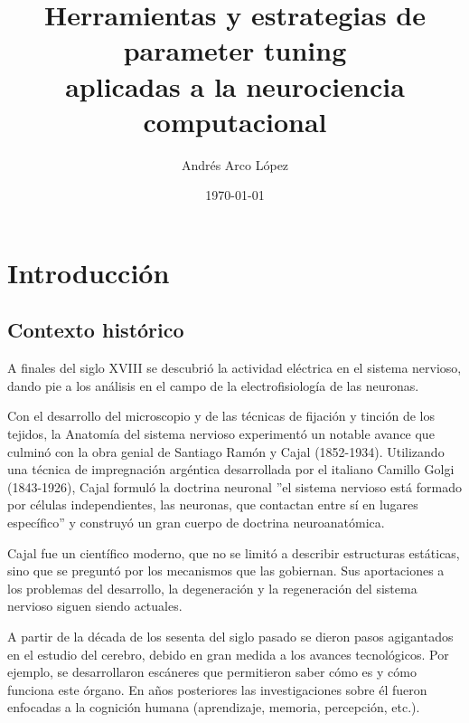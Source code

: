 \documentclass[oneside,openright,titlepage,numbers=noenddot,openany,headinclude,footinclude=true,
cleardoublepage=empty,abstractoff,BCOR=5mm,paper=a4,fontsize=12pt,main=spanish]{scrreprt}
\author{Andrés Arco López}
\date{\today}
\title{Herramientas y estrategias de parameter tuning \\aplicadas a la neurociencia computacional}
\begin{document}
\maketitle



\newpage
\vspace*{\fill}
\doclicenseThis










\tableofcontents


\chapter{Introducción}\label{part:intro}

\section{Contexto histórico}\label{part:conthist}
A finales del siglo XVIII se descubrió la actividad eléctrica en el sistema nervioso, dando pie a los análisis en el campo de la electrofisiología de las neuronas.

Con el desarrollo del microscopio y de las técnicas de fijación y tinción de los tejidos, la Anatomía del sistema nervioso experimentó un notable avance que culminó con la obra genial de Santiago Ramón y Cajal (1852-1934). Utilizando una técnica de impregnación argéntica desarrollada por el italiano Camillo Golgi (1843-1926), Cajal formuló la doctrina neuronal ''el sistema nervioso está formado por células independientes, las neuronas, que contactan entre sí en lugares específico'' y construyó un gran cuerpo de doctrina neuroanatómica.

Cajal fue un científico moderno, que no se limitó a describir estructuras estáticas, sino que se preguntó por los mecanismos que las gobiernan. Sus aportaciones a los problemas del desarrollo, la degeneración y la regeneración del sistema nervioso siguen siendo actuales.

A partir de la década de los sesenta del siglo pasado se dieron pasos agigantados en el estudio del cerebro, debido en gran medida a los avances tecnológicos. Por ejemplo, se desarrollaron escáneres que permitieron saber cómo es y cómo funciona este órgano. En años posteriores las investigaciones sobre él fueron enfocadas a la cognición humana (aprendizaje, memoria, percepción, etc.).
\end{document}

